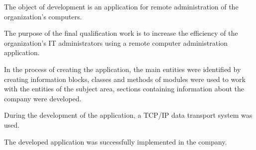 The object of development is an application for remote administration of the organization's computers.

The purpose of the final qualification work is \linebreak to increase the efficiency of the organization's IT administrators using a remote computer administration application.

In the process of creating the application, the main entities were identified by creating information blocks, classes and methods of modules were used to work with the entities of the subject area, sections containing information about the company were developed.

During the development of the application, a TCP/IP data transport system was used.

The developed application was successfully implemented in the company.
